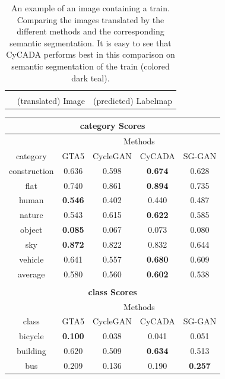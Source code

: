 \begin{table}
\begin{tabular}{cc||c}
\begin{minipage}[c]{0.45\textwidth}
		\end{minipage} \\
		\multicolumn{1}{c}{} & (translated) Image & (predicted) Labelmap
	\end{tabular} 
	\caption{An example of an image containing a train. Comparing the images translated by the different methods and the corresponding semantic segmentation. It is easy to see that CyCADA performs best in this comparison on semantic segmentation of the train (colored dark teal).}
	\label{table:train}
\end{table}

\begin{table}
	\centering
	\begin{tabular}{|c|c|c|c|c|}
		\multicolumn{5}{c}{\textbf{category Scores}}\\
		\hline
		\multicolumn{1}{c}{} & \multicolumn{4}{c}{Methods}\\
		\cline{2-5}
		\multicolumn{1}{c|}{category} & GTA5 & CycleGAN & CyCADA & SG-GAN\\ 
		\hline
		construction & 0.636 & 0.598 & \textbf{0.674} & 0.628\\ 
		\hline 
		flat & 0.740 & 0.861 & \textbf{0.894} & 0.735\\ 
		\hline 
		human & \textbf{0.546} & 0.402 & 0.440 & 0.487\\ 
		\hline 
		nature & 0.543 & 0.615 & \textbf{0.622} & 0.585\\ 
		\hline 
		object & \textbf{0.085} & 0.067 & 0.073 & 0.080\\ 
		\hline 
		sky & \textbf{0.872} & 0.822 & 0.832 & 0.644\\ 
		\hline 
		vehicle & 0.641 & 0.557 & \textbf{0.680} & 0.609\\ 
		\hline \hline
		average & 0.580 & 0.560 & \textbf{0.602} & 0.538\\
		\hline
		\multicolumn{5}{c}{}\\
		\multicolumn{5}{c}{\textbf{class Scores}}\\
		\hline
		\multicolumn{1}{c}{} & \multicolumn{4}{c}{Methods}\\
		\cline{2-5}
		\multicolumn{1}{c|}{class} & GTA5 & CycleGAN & CyCADA & SG-GAN\\ 
		\hline
		bicycle & \textbf{0.100} & 0.038 & 0.041 & 0.051\\ 
		\hline 
		building & 0.620 & 0.509 & \textbf{0.634} & 0.513\\ 
		\hline 
		bus & 0.209 & 0.136 & 0.190 & \textbf{0.257}\\ 

\end{tabular}
\end{table}

